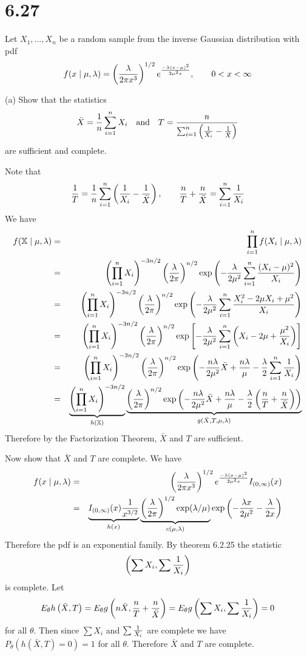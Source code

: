 \section*{6.27}
Let $X_1,\ldots,X_n$ be a random sample from the inverse Gaussian
distribution with pdf
$$f(x\mid\mu,\lambda)=\left({\lambda\over2\pi x^3}\right)^{1/2}
e^{-\lambda(x-\mu)^2\over2\mu^2x},\qquad0<x<\infty
$$

\bigskip
\noindent
(a) Show that the statistics
$$\bar X={1\over n}\sum_{i=1}^n X_i
\quad\hbox{and}\quad
T={n\over\sum_{i=1}^n\left({1\over X_i}-{1\over\bar X}\right)}
$$
are sufficient and complete.

\bigskip
\noindent
Note that
$${1\over T}={1\over n}\sum_{i=1}^n\left(
{1\over X_i}-{1\over\bar X}\right),\qquad
{n\over T}+{n\over\bar X}=\sum_{i=1}^n{1\over X_i}
$$
We have
\begin{eqnarray*}
f(\mathbb X\mid\mu,\lambda)&=&\prod_{i=1}^nf(X_i\mid\mu,\lambda)\\
&=&
\left(\prod_{i=1}^nX_i\right)^{-3n/2}
\left({\lambda\over2\pi}\right)^{n/2}
\exp\left(-{\lambda\over2\mu^2}\sum_{i=1}^n{(X_i-\mu)^2\over X_i}\right)\\
&=&
\left(\prod_{i=1}^nX_i\right)^{-3n/2}
\left({\lambda\over2\pi}\right)^{n/2}
\exp\left(
-{\lambda\over2\mu^2}\sum_{i=1}^n{X_i^2-2\mu X_i+\mu^2\over X_i}\right)\\
&=&
\left(\prod_{i=1}^nX_i\right)^{-3n/2}
\left({\lambda\over2\pi}\right)^{n/2}
\exp\left[
-{\lambda\over2\mu^2}\sum_{i=1}^n\left(
X_i-2\mu+{\mu^2\over X_i}\right)\right]\\
&=&
\left(\prod_{i=1}^nX_i\right)^{-3n/2}
\left({\lambda\over2\pi}\right)^{n/2}
\exp\left(
-{n\lambda\over2\mu^2}\bar X
+{n\lambda\over\mu}
-{\lambda\over2}\sum_{i=1}^n{1\over X_i}\right)\\
&=&
\underbrace{
\left(\prod_{i=1}^nX_i\right)^{-3n/2}}_{h(\mathbb X)}
\underbrace{
\left({\lambda\over2\pi}\right)^{n/2}
\exp\left(
-{n\lambda\over2\mu^2}\bar X
+{n\lambda\over\mu}
-{\lambda\over2}\left(
{n\over T}+{n\over\bar X}\right)\right)
}_{g(\bar X,T,\mu,\lambda)}
\end{eqnarray*}
Therefore by the Factorization Theorem, $\bar X$ and $T$ are
sufficient.

\bigskip
\noindent
Now show that $\bar X$ and $T$ are complete.
We have
\begin{eqnarray*}
f(x\mid\mu,\lambda)&=&
\left({\lambda\over2\pi x^3}\right)^{1/2}
e^{-\lambda(x-\mu)^2\over2\mu^2x}I_{(0,\infty)}(x)\\
&=&
\underbrace{
I_{(0,\infty)}(x){1\over x^{3/2}}}_{h(x)}
\underbrace{
\left({\lambda\over2\pi}\right)^{1/2}\exp(\lambda/\mu)
}_{c(\mu,\lambda)}
\exp\left(-{\lambda x\over2\mu^2}-{\lambda\over2x}\right)
\end{eqnarray*}
Therefore the pdf is an exponential family.
By theorem 6.2.25 the statistic
$$\left(\sum X_i,\sum{1\over X_i}\right)$$
is complete.
Let
$$E_\theta h\left(\bar X,T\right)
=E_\theta g\left(n\bar X,{n\over T}+{n\over\bar X}\right)
=E_\theta g\left(\sum X_i,\sum{1\over X_i}\right)=0$$
for all $\theta$.
Then since $\sum X_i$ and $\sum {1\over X_i}$ are complete we have
$P_\theta (h(\bar X, T)=0)=1$ for all $\theta$.
Therefore $\bar X$ and $T$ are complete.


